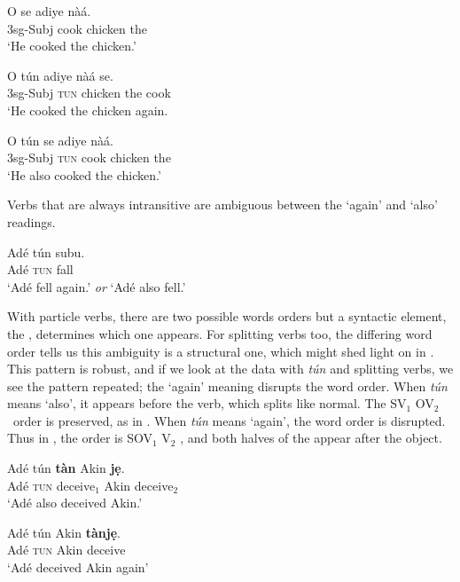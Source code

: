 \documentclass[output=paper,newtxmath,modfonts,nonflat,draftmode]{langsci/langscibook}
\begin{document}
\ea 
 \ea 
   \gll O se adiye nàá. \\
   3sg-Subj cook chicken the \\
   \glt `He cooked the chicken.'
   \label{ex:parrish:reg}
   
   \ex 
   \gll O tún adiye nàá se. \\
   3sg-Subj {\textsc{tun}} chicken the cook \\
   \glt `He cooked the chicken again.
   \label{ex:parrish:again}
   

   
   \ex 
   \gll O tún se adiye nàá. \\
   3sg-Subj {\textsc{tun}} cook chicken the \\
   \glt `He also cooked the chicken.'
   \label{ex:parrish:also}
 \z 
\z


Verbs that are always intransitive are ambiguous between the `again' and `also' readings.

\ea 
   \gll Adé tún subu. \\
   Adé {\textsc{tun}} fall \\
   \glt `Adé fell again.' \textit{or} `Adé also fell.'
   \label{ex:parrish:intransitive}
\z

With  particle verbs, there are two possible words orders but a syntactic element, the , determines which one appears. For splitting verbs too, the differing word order tells us this ambiguity is a structural one, which might shed light on  in . This pattern is robust, and if we look at the data with \textit{tún} and splitting verbs, we see the pattern repeated; the ‘again’ meaning disrupts the word order. When \textit{tún} means ‘also’, it appears before the verb, which splits like normal. The SV$_{1}$ OV$_{2}$\ order is preserved, as in . When \textit{tún} means ‘again’, the word order is disrupted. Thus in , the order is SOV$_{1}$ V$_{2}$ , and both halves of the  appear after the object.


\ea 
 \ea 
   \gll Adé tún \textbf{tàn} Akin \textbf{j\d{e}}. \\
   Adé {\textsc{tun}} {deceive$_{1}$} Akin {deceive$_{2}$} \\
   \glt `Adé also deceived Akin.'
   \label{ex:parrish:tun-Bill-je}
   
  \ex 
   \gll Adé tún Akin \textbf{tànj\d{e}}. \\
   Adé {\textsc{tun}} Akin deceive \\
   \glt `Adé deceived Akin again'
   \label{ex:parrish:Bill-tanje}
 \z 
\z
\end{document}
